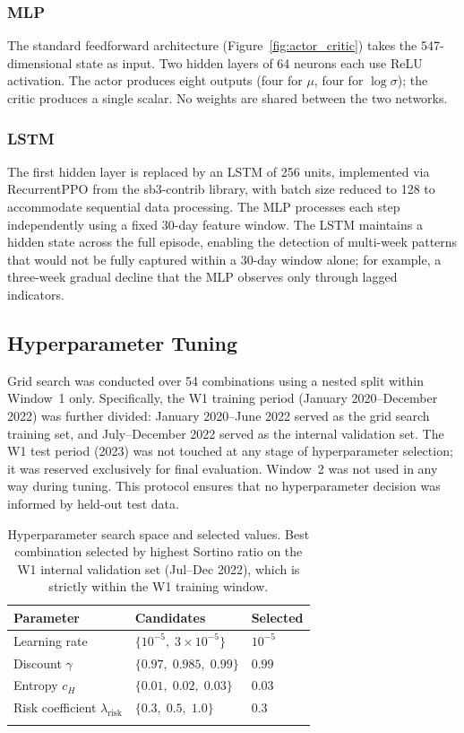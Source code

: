 \documentclass[pdflatex,sn-mathphys-num]{sn-jnl}
\begin{document}
\subsubsection{MLP}

The standard feedforward architecture (Figure~\ref{fig:actor_critic}) takes the
547-dimensional state as input. Two hidden layers of 64 neurons each use ReLU
activation. The actor produces eight outputs (four for $\mu$, four for
$\log\sigma$); the critic produces a single scalar. No weights are shared
between the two networks.

\subsubsection{LSTM}

The first hidden layer is replaced by an LSTM of 256 units, implemented via
RecurrentPPO from the sb3-contrib library, with batch size reduced to 128 to
accommodate sequential data processing. The MLP processes each step
independently using a fixed 30-day feature window. The LSTM maintains a hidden
state across the full episode, enabling the detection of multi-week patterns
that would not be fully captured within a 30-day window alone; for example, a
three-week gradual decline that the MLP observes only through lagged indicators.

\subsection{Hyperparameter Tuning}\label{sec:hparam}

Grid search was conducted over 54 combinations using a nested split within
Window~1 only. Specifically, the W1 training period (January 2020--December 2022)
was further divided: January 2020--June 2022 served as the grid search training
set, and July--December 2022 served as the internal validation set. The W1 test
period (2023) was not touched at any stage of hyperparameter selection; it was
reserved exclusively for final evaluation. Window~2 was not used in any way
during tuning. This protocol ensures that no hyperparameter decision was informed
by held-out test data.

\begin{table}[h]
\caption{Hyperparameter search space and selected values. Best combination
selected by highest Sortino ratio on the W1 internal validation set
(Jul--Dec 2022), which is strictly within the W1 training window.}\label{tab:hyperparams}
\begin{tabular*}{\textwidth}{@{\extracolsep\fill}lll}
\toprule
Parameter & Candidates & Selected \\
\midrule
Learning rate & $\{10^{-5},\; 3 \times 10^{-5}\}$ & $10^{-5}$ \\
Discount $\gamma$ & $\{0.97,\; 0.985,\; 0.99\}$ & $0.99$ \\
Entropy $c_H$ & $\{0.01,\; 0.02,\; 0.03\}$ & $0.03$ \\
Risk coefficient $\lambda_{\mathrm{risk}}$ & $\{0.3,\; 0.5,\; 1.0\}$ & $0.3$ \\
\botrule
\end{tabular*}
\end{table}
\end{document}
